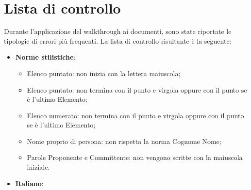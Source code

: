 \appendix



\section{Lista di controllo}
\label{sec:ListaControllo}
Durante l'applicazione del walkthrough ai documenti, sono state riportate le tipologie
di errori più frequenti. La lista di controllo risultante è la seguente:
\begin{itemize}

\item \textbf{Norme stilistiche}:
\begin{itemize}
\item Elenco puntato: non inizia con la lettera maiuscola;
\item Elenco puntato: non termina con il punto e virgola oppure con il punto se è
l’ultimo Elemento;
\item Elenco numerato: non termina con il punto e virgola oppure con il punto se
è l’ultimo Elemento;
\item Nome proprio di persona: non rispetta la norma Cognome Nome;
\item Parole Proponente e Committente: non vengono scritte con la maiuscola
iniziale.
\end{itemize}
\item \textbf{Italiano}:
\begin{itemize}


\end{itemize}
\end{itemize}

